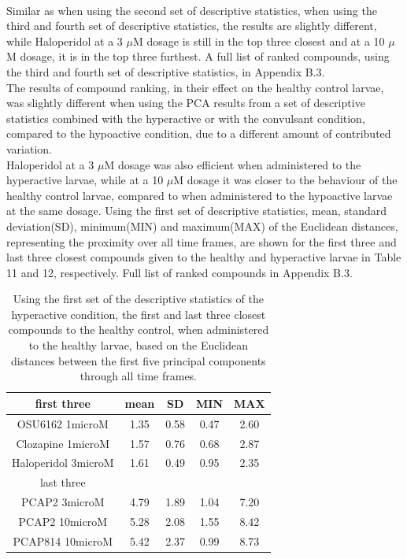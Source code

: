 \documentclass[a4paper,12pt]{article}
\begin{document}
\\
Similar as when using the second set of descriptive statistics, when using the third and fourth set of descriptive statistics, the results are slightly different, while Haloperidol at a 3 $\mu$M dosage is still in the top three closest and at a 10 $\mu$M dosage, it is in the top three furthest. A full list of ranked compounds, using the third and fourth set of descriptive statistics, in Appendix B.3.
\\
The results of compound ranking, in their effect on the healthy control larvae, was slightly different when using the PCA results from a set of descriptive statistics combined with the hyperactive or with the convulsant condition, compared to the hypoactive condition, due to a different amount of contributed variation.
\\Haloperidol at a 3 $\mu$M dosage was also efficient when administered to the hyperactive larvae, while at a 10 $\mu$M dosage it was closer to the behaviour of the healthy control larvae, compared to when administered to the hypoactive larvae at the same dosage. Using the first set of descriptive statistics, mean, standard deviation(SD), minimum(MIN) and maximum(MAX) of the Euclidean distances, representing the proximity over all time frames, are shown for the first three and last three closest compounds given to the healthy and hyperactive larvae in Table 11 and 12, respectively. Full list of ranked compounds in Appendix B.3.
\begin{table}[h!]\tiny
\centering
\begin{tabular}{|c|c|c|c|c|}
\hline
first three         & mean & SD   & MIN  & MAX  \\ \hline
OSU6162 1microM     & 1.35 & 0.58 & 0.47 & 2.60  \\ \hline
Clozapine 1microM   & 1.57 & 0.76 & 0.68 & 2.87 \\ \hline
Haloperidol 3microM & 1.61 & 0.49 & 0.95 & 2.35 \\ \hline
last three          & \multicolumn{4}{c|}{}     \\ \hline
PCAP2 3microM       & 4.79 & 1.89 & 1.04 & 7.20  \\ \hline
PCAP2 10microM      & 5.28 & 2.08 & 1.55 & 8.42 \\ \hline
PCAP814 10microM    & 5.42 & 2.37 & 0.99 & 8.73 \\ \hline
\end{tabular}
\caption{Using the first set of the descriptive statistics of the hyperactive condition, the first and last three closest compounds to the healthy control, when administered to the healthy larvae, based on the Euclidean distances between the first five principal components through all time frames.}
\end{table}
\end{document}
